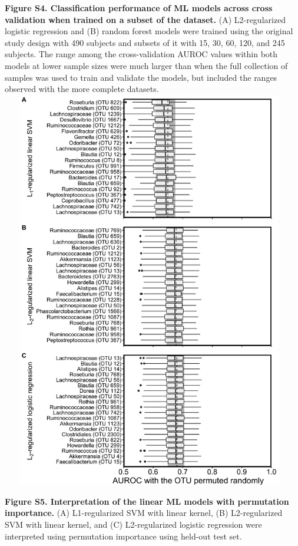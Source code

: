 \documentclass[11pt,]{article}
\begin{document}
\textbf{Figure S4. Classification performance of ML models across cross
validation when trained on a subset of the dataset.} (A) L2-regularized
logistic regression and (B) random forest models were trained using the
original study design with 490 subjects and subsets of it with 15, 30,
60, 120, and 245 subjects. The range among the cross-validation AUROC
values within both models at lower sample sizes were much larger than
when the full collection of samples was used to train and validate the
models, but included the ranges observed with the more complete
datasets. \newpage
\includegraphics[height=17.5cm, width=13cm]{Figure_S5.png}

\textbf{Figure S5. Interpretation of the linear ML models with
permutation importance.} (A) L1-regularized SVM with linear kernel, (B)
L2-regularized SVM with linear kernel, and (C) L2-regularized logistic
regression were interpreted using permutation importance using held-out
test set.

\newpage
\end{document}
